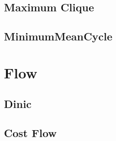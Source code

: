 \documentclass[a4paper,10pt,twocolumn,oneside]{article}
\begin{document}
%

%

%

\subsection{Maximum Clique}


\subsection{MinimumMeanCycle}


\section{Flow}
%

\subsection{Dinic} %


\subsection{Cost Flow} %


%
\end{document}
